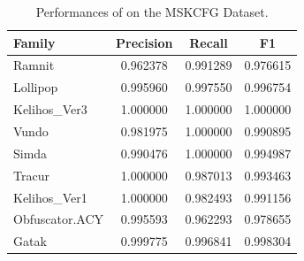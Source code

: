 \begin{table}
    \caption{Performances of \sysname on the MSKCFG Dataset.}
    \begin{center}
        \begin{tabular}{lccc}
            \hline
            \hline
            Family       &  Precision &    Recall &        F1 \\
            \hline
            Ramnit       &   0.962378 &  0.991289 &  0.976615 \\
            Lollipop       &   0.995960 &  0.997550 &  0.996754 \\
            Kelihos\_Ver3  &   1.000000 &  1.000000 &  1.000000 \\
            Vundo       &   0.981975 &  1.000000 &  0.990895 \\
            Simda       &   0.990476 &  1.000000 &  0.994987 \\
            Tracur       &   1.000000 &  0.987013 &  0.993463 \\
            Kelihos\_Ver1  &   1.000000 &  0.982493 &  0.991156 \\
            Obfuscator.ACY  &   0.995593 &  0.962293 &  0.978655 \\
            Gatak       &   0.999775 &  0.996841 &  0.998304 \\
            \hline
        \end{tabular}
    \end{center}
    \label{MG:Tab:MSKCFGScores}
\end{table}

